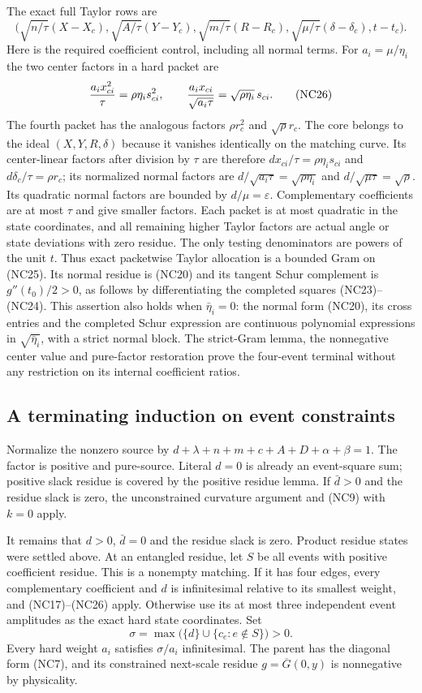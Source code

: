 The exact full Taylor rows are
\[
\big(\sqrt{n/\tau}(X-X_c),\sqrt{A/\tau}(Y-Y_c),
\sqrt{m/\tau}(R-R_c),\sqrt{\mu/\tau}(\delta-\delta_c),t-t_c\big).
 \tag{NC25}
\]
Here is the required coefficient control, including all normal terms.
For $a_i=\mu/\eta_i$ the two center factors in a hard packet are
\[
 {a_ix_{ci}^2\over\tau}=\rho\eta_i s_{ci}^2,
 \qquad {a_ix_{ci}\over\sqrt{a_i\tau}}
                    =\sqrt{\rho\eta_i}\,s_{ci}.      \tag{NC26}
\]
The fourth packet has the analogous factors $\rho r_c^2$ and
$\sqrt\rho r_c$. The core belongs to the ideal $(X,Y,R,\delta)$
because it vanishes identically on the matching curve. Its center-linear
factors after division by $\tau$ are therefore
$d x_{ci}/\tau=\rho\eta_i s_{ci}$ and
$d\delta_c/\tau=\rho r_c$; its normalized normal factors are
$d/\sqrt{a_i\tau}=\sqrt{\rho\eta_i}$ and
$d/\sqrt{\mu\tau}=\sqrt\rho$. Its quadratic normal factors are
bounded by $d/\mu=\varepsilon$. Complementary coefficients are at
most $\tau$ and give smaller factors. Each packet is at most quadratic in the
state coordinates, and all remaining higher Taylor factors are
actual angle or state deviations with zero residue. The only testing
denominators are powers of the unit $t$. Thus exact packetwise Taylor
allocation is a bounded Gram on (NC25). Its normal residue is (NC20)
and its tangent Schur complement is $g''(t_0)/2>0$, as follows by
differentiating the completed squares (NC23)--(NC24). This assertion
also holds when $\bar\eta_i=0$: the normal form (NC20), its cross
entries and the completed Schur expression are continuous polynomial
expressions in $\sqrt{\bar\eta_i}$, with a strict normal block.
The strict-Gram lemma, the nonnegative center value and pure-factor
restoration prove the four-event terminal without any restriction
on its internal coefficient ratios.

\subsection{A terminating induction on event constraints}

Normalize the nonzero source by $d+\lambda+n+m+c+A+D+\alpha+\beta=1$.
The factor is positive and pure-source. Literal $d=0$ is already an
event-square sum; positive slack residue is covered by the positive
residue lemma. If $\bar d>0$ and the residue slack is zero, the
unconstrained curvature argument and (NC9) with $k=0$ apply.

It remains that $d>0$, $\bar d=0$ and the residue slack is zero.
Product residue states were settled above. At an entangled residue,
let $S$ be all events with positive coefficient residue. This is a
nonempty matching. If it has four edges, every complementary
coefficient and $d$ is infinitesimal relative to its smallest weight,
and (NC17)--(NC26) apply. Otherwise use its at most three independent
event amplitudes as the exact hard state coordinates. Set
\[
 \sigma=\max\bigl(\{d\}\cup\{c_e:e\notin S\}\bigr)>0.
\]
Every hard weight $a_i$ satisfies $\sigma/a_i$ infinitesimal. The
parent has the diagonal form (NC7), and its constrained next-scale
residue $g=\overline G(0,y)$ is nonnegative by physicality.

